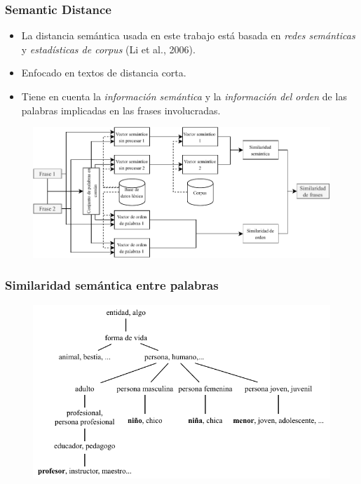 \begin{frame}
	\frametitle{Semantic Distance}
	\begin{itemize}
		\scriptsize
		\item La distancia semántica usada en este trabajo está basada en \textit{redes semánticas} y \textit{estadísticas de corpus} (Li et al., 2006).
		\item Enfocado en textos de distancia corta.
		\item Tiene en cuenta la \textit{información semántica} y la \textit{información del orden} de las palabras implicadas en las frases involucradas.
	\end{itemize}

	\begin{figure}
		\centering
		\includegraphics[width=0.7\linewidth]{../7_marco_teorico/imagenes/similaridad_sematinca_metodo}
		\label{fig:similaridadsematincametodo}
	\end{figure}
\end{frame}

\begin{frame}
	\frametitle{Similaridad semántica entre palabras}
	\begin{figure}
		\centering
		\includegraphics[width=0.7\linewidth]{../7_marco_teorico/imagenes/taxonomia_semantica}
		\label{fig:taxonomiasemantica}
	\end{figure}
\end{frame}

